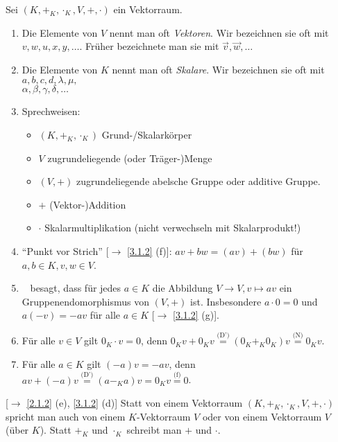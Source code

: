 \documentclass[../../main.tex]{subfiles}
\begin{document}
\begin{bem}\label{6.1.2}
Sei $(K,+_K,\cdot_K,V,+,\cdot)$ ein Vektorraum.
\begin{enumerate}[\normalfont(a)]
\item Die Elemente von $V$ nennt man oft \emph{Vektoren}. Wir bezeichnen sie oft mit\\
$v,w,u,x,y,\dots$. Früher bezeichnete man sie mit $\overrightarrow v, \overrightarrow w,\dots$
\item Die Elemente von $K$ nennt man oft \emph{Skalare}. Wir bezeichnen sie oft mit $a,b,c,d,\lambda,\mu,$\\
$\alpha,\beta, \gamma, \delta,\ldots$
\item Sprechweisen:
\begin{itemize}
\item $(K,+_K,\cdot_K)$ Grund-/Skalarkörper
\item $V$ zugrundeliegende (oder Träger-)Menge
\item $(V,+)$ zugrundeliegende abelsche Gruppe oder additive Gruppe.
\item $+$ (Vektor-)Addition
\item $\cdot$ Skalarmultiplikation (nicht verwechseln mit Skalarprodukt!)
\end{itemize}
\item "`Punkt vor Strich"' [$\to$ \ref{3.1.2} (f)]: $av+bw = (av)+(bw)$ für $a,b\in K, v,w\in V$.
\item \vecD~ besagt, dass für jedes $a\in K$ die Abbildung $V\to V, v\mapsto av$ ein Gruppenendomorphismus von $(V,+)$ ist. Insbesondere $a\cdot 0=0$ und $a(-v) = -av$ für alle $a\in K$ [$\to$ \ref{3.1.2} (g)].
\item Für alle $v\in V$ gilt $0_K \cdot v = 0$, denn $0_Kv+0_Kv \overset{\text{(D')}}{=} (0_K+_K0_K) v \overset{\text{(N)}}{=}0_K v$.
\item Für alle $a\in K$ gilt $(-a)v = -av$, denn $av + (-a)v \overset{\text{(D')}}{=} (a-_Ka)v = 0_K v \overset{\text{(f)}}{=} 0$.
\end{enumerate}
\end{bem}

\begin{sprnt}\mbox{}\label{6.1.3}
[$\to$ \ref{2.1.2} (e), \ref{3.1.2} (d)] Statt von einem Vektorraum $(K, +_K,\cdot_K, V,+,\cdot)$ spricht man auch von einem $K$-Vektorraum $V$ oder von einem Vektorraum $V$ (über $K$). Statt $+_K$ und $\cdot_K$ schreibt man $+$ und $\cdot$.
\end{sprnt}
\end{document}
